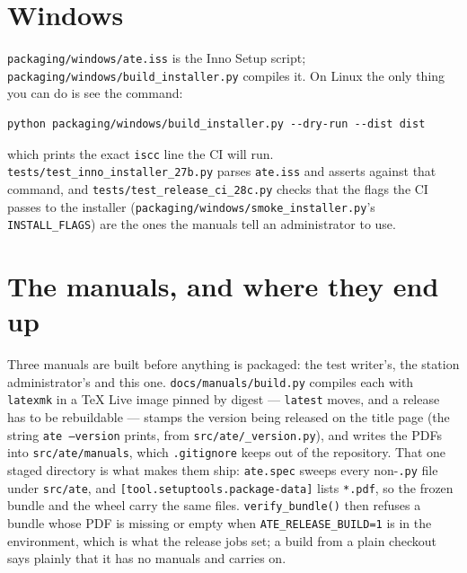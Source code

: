 \section{Windows}

\texttt{packaging/\allowbreak{}windows/\allowbreak{}ate.iss} is the Inno Setup script;
\texttt{packaging/\allowbreak{}windows/\allowbreak{}build\_\allowbreak{}installer.py} compiles it. On Linux the only thing you can do is see the
command:

\begin{lstlisting}[language=ATEShell]
python packaging/windows/build_installer.py --dry-run --dist dist
\end{lstlisting}

which prints the exact \texttt{iscc} line the CI will run. \texttt{tests/\allowbreak{}test\_\allowbreak{}inno\_\allowbreak{}installer\_\allowbreak27b.py}
parses \texttt{ate.iss} and asserts against that command, and
\texttt{tests/\allowbreak{}test\_\allowbreak{}release\_\allowbreak{}ci\_\allowbreak28c.py} checks that the flags the CI passes to the installer
(\texttt{packaging/\allowbreak{}windows/\allowbreak{}smoke\_\allowbreak{}installer.py}'s \texttt{INSTALL\_FLAGS}) are the ones the manuals tell an
administrator to use.

\section{The manuals, and where they end up}

Three manuals are built before anything is packaged: the test writer's, the station administrator's
and this one. \texttt{docs/\allowbreak{}manuals/\allowbreak{}build.py} compiles each with \texttt{latexmk} in a TeX Live
image pinned by digest --- \texttt{latest} moves, and a release has to be rebuildable --- stamps the
version being released on the title page (the string \texttt{ate --version} prints, from
\texttt{src/\allowbreak{}ate/\allowbreak{}\_\allowbreak{}version.py}), and writes the PDFs into
\texttt{src/\allowbreak{}ate/\allowbreak{}manuals}, which \texttt{.gitignore} keeps out of the repository. That one staged
directory is what makes them ship: \texttt{ate.spec} sweeps every non-\texttt{.py} file under
\texttt{src/ate}, and \texttt{[tool.setuptools.package-data]} lists \texttt{*.pdf}, so the frozen bundle and
the wheel carry the same files. \texttt{verify\_bundle()} then refuses a bundle whose PDF is missing or
empty when \texttt{ATE\_\allowbreak{}RELEASE\_\allowbreak{}BUILD=1} is in the environment, which is what the release jobs set;
a build from a plain checkout says plainly that it has no manuals and carries on.

